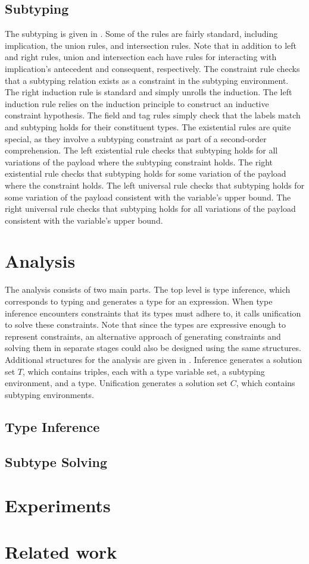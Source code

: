 \documentclass[sigplan,screen,review]{acmart}
\begin{document}
\subsection{Subtyping}
The subtyping is given in .
Some of the rules are fairly standard, including implication, the union rules, and intersection rules.
Note that in addition to left and right rules, union and intersection each have rules for 
interacting with implication's antecedent and consequent, respectively.
The constraint rule checks that a subtyping relation exists as a constraint in the subtyping environment.
The right induction rule is standard and simply unrolls the induction.
The left induction rule relies on the induction principle to construct an 
inductive constraint hypothesis.  
The field and tag rules simply check that the labels match and subtyping holds for their constituent types.
The existential rules are quite special, as they involve a subtyping constraint as part of 
a second-order comprehension. 
The left existential rule checks that subtyping holds for all variations of the payload 
where the subtyping constraint holds. 
The right existential rule checks that subtyping holds for some variation of the payload where the constraint holds.
The left universal rule checks that subtyping holds for some variation of the payload consistent with
the variable's upper bound. 
The right universal rule checks that subtyping holds for all variations of the payload consistent with
the variable's upper bound.


\section{Analysis}

The analysis consists of two main parts. The top level is type inference, which corresponds to typing
and generates a type for an expression. When type inference encounters constraints that its types must adhere to,
it calls unification to solve these constraints. Note that since the types are expressive enough to represent constraints,
an alternative approach of generating constraints and solving them in separate stages could also be designed 
using the same structures. Additional structures for the analysis are given in . 
Inference generates a solution set $T$, which contains triples, each with a type variable set, a subtyping environment, and a type.  
Unification generates a solution set $C$, which contains subtyping environments. 


\subsection{Type Inference}

\subsection{Subtype Solving}


\section{Experiments}


\section{Related work}

\end{document}
